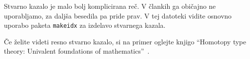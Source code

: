 \documentclass{article}
\begin{document}
Stvarno kazalo%
%
je malo bolj komplicirana reč. V člankih ga običajno ne uporabljamo, za daljša besedila pa
pride prav. V tej datoteki vidite osnovno uporabo paketa \texttt{makeidx} za izdelavo
stvarnega kazala.
%

Če želite videti resno stvarno kazalo, si na primer oglejte knjigo ``Homotopy type theory:
Univalent foundations of mathematics''~\cite{hottbook}.







\printindex
\end{document}
